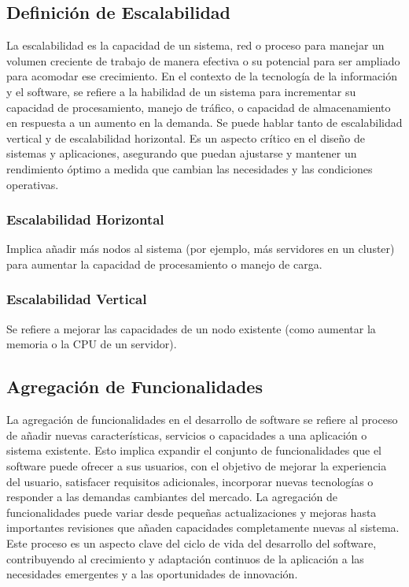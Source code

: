 \subsection{Definición de Escalabilidad}
La escalabilidad es la capacidad de un sistema, red o proceso para manejar un volumen creciente de trabajo de manera efectiva o su potencial para ser ampliado para acomodar ese crecimiento. En el contexto de la tecnología de la información y el software, se refiere a la habilidad de un sistema para incrementar su capacidad de procesamiento, manejo de tráfico, o capacidad de almacenamiento en respuesta a un aumento en la demanda. Se puede hablar tanto de escalabilidad vertical y de escalabilidad horizontal. Es un aspecto crítico en el diseño de sistemas y aplicaciones, asegurando que puedan ajustarse y mantener un rendimiento óptimo a medida que cambian las necesidades y las condiciones operativas.

\subsubsection{Escalabilidad Horizontal}
Implica añadir más nodos al sistema (por ejemplo, más servidores en un cluster) para aumentar la capacidad de procesamiento o manejo de carga.

\subsubsection{Escalabilidad Vertical}
Se refiere a mejorar las capacidades de un nodo existente (como aumentar la memoria o la CPU de un servidor).

\subsection{Agregación de Funcionalidades}
La agregación de funcionalidades en el desarrollo de software se refiere al proceso de añadir nuevas características, servicios o capacidades a una aplicación o sistema existente. Esto implica expandir el conjunto de funcionalidades que el software puede ofrecer a sus usuarios, con el objetivo de mejorar la experiencia del usuario, satisfacer requisitos adicionales, incorporar nuevas tecnologías o responder a las demandas cambiantes del mercado. La agregación de funcionalidades puede variar desde pequeñas actualizaciones y mejoras hasta importantes revisiones que añaden capacidades completamente nuevas al sistema. Este proceso es un aspecto clave del ciclo de vida del desarrollo del software, contribuyendo al crecimiento y adaptación continuos de la aplicación a las necesidades emergentes y a las oportunidades de innovación.

